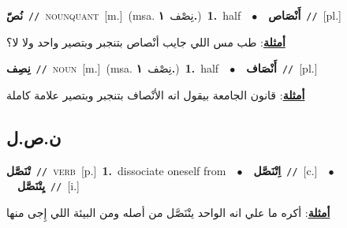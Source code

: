 \documentclass[10pt,a4paper,twoside]{article} %
\begin{document}
\begin{multicols}{2}
{\setlength\topsep{0pt}\textbf{\foreignlanguage{arabic}{نُصّ}}\ {\color{gray}\texttt{//}\color{black}}\ \textsc{noun\textunderscore quant}\ [m.]\ \color{gray}(msa. \foreignlanguage{arabic}{نِصْف}~\foreignlanguage{arabic}{\textbf{١.}})\color{black}\ \textbf{1.}~half\ \ $\bullet$\ \ \setlength\topsep{0pt}\textbf{\foreignlanguage{arabic}{أَنْصَاص}}\ {\color{gray}\texttt{//}\color{black}}\ [pl.]\  \begin{flushright}\color{gray}\foreignlanguage{arabic}{\textbf{\underline{\foreignlanguage{arabic}{أمثلة}}}: طب مس اللي جايب أنْصاص بتنجبر وبتصير واحد ولا لا؟}\end{flushright}\color{black}} \vspace{2mm}

{\setlength\topsep{0pt}\textbf{\foreignlanguage{arabic}{نِصِف}}\ {\color{gray}\texttt{//}\color{black}}\ \textsc{noun}\ [m.]\ \color{gray}(msa. \foreignlanguage{arabic}{نِصْف}~\foreignlanguage{arabic}{\textbf{١.}})\color{black}\ \textbf{1.}~half\ \ $\bullet$\ \ \setlength\topsep{0pt}\textbf{\foreignlanguage{arabic}{أَنْصَاف}}\ {\color{gray}\texttt{//}\color{black}}\ [pl.]\  \begin{flushright}\color{gray}\foreignlanguage{arabic}{\textbf{\underline{\foreignlanguage{arabic}{أمثلة}}}: قانون الجامعة بيقول انه الأنْصاف بتنجبر وبتصير علامة كاملة}\end{flushright}\color{black}} \vspace{2mm}

\vspace{-3mm}
\subsection*{\color{blue}\foreignlanguage{arabic}{ن.ص.ل}\color{blue}{}} 

{\setlength\topsep{0pt}\textbf{\foreignlanguage{arabic}{تْنَصَّل}}\ {\color{gray}\texttt{//}\color{black}}\ \textsc{verb}\ [p.]\ \textbf{1.}~dissociate oneself from\ \ $\bullet$\ \ \setlength\topsep{0pt}\textbf{\foreignlanguage{arabic}{اِتْنَصَّل}}\ {\color{gray}\texttt{//}\color{black}}\ [c.]\ \ $\bullet$\ \ \setlength\topsep{0pt}\textbf{\foreignlanguage{arabic}{يِتْنَصَّل}}\ {\color{gray}\texttt{//}\color{black}}\ [i.]\  \begin{flushright}\color{gray}\foreignlanguage{arabic}{\textbf{\underline{\foreignlanguage{arabic}{أمثلة}}}: أكره ما علي انه الواحد يتْنَصَّل من أصله ومن البيئة اللي إِجى منها}\end{flushright}\color{black}} \vspace{2mm}


\end{multicols}
\end{document}
